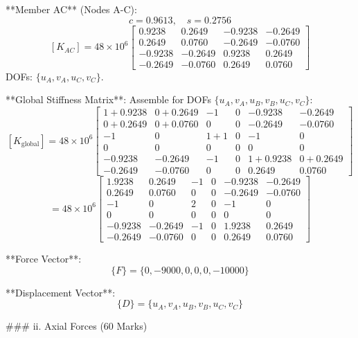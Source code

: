 **Member AC** (Nodes A-C):
\[
c = 0.9613, \quad s = 0.2756
\]
\[
[K_{AC}] = 48 \times 10^6 \begin{bmatrix} 0.9238 & 0.2649 & -0.9238 & -0.2649 \\ 0.2649 & 0.0760 & -0.2649 & -0.0760 \\ -0.9238 & -0.2649 & 0.9238 & 0.2649 \\ -0.2649 & -0.0760 & 0.2649 & 0.0760 \end{bmatrix}
\]
DOFs: \( \{ u_A, v_A, u_C, v_C \} \).

**Global Stiffness Matrix**:
Assemble for DOFs \( \{ u_A, v_A, u_B, v_B, u_C, v_C \} \):
\[
[K_{\text{global}}] = 48 \times 10^6 \begin{bmatrix}
1 + 0.9238 & 0 + 0.2649 & -1 & 0 & -0.9238 & -0.2649 \\
0 + 0.2649 & 0 + 0.0760 & 0 & 0 & -0.2649 & -0.0760 \\
-1 & 0 & 1 + 1 & 0 & -1 & 0 \\
0 & 0 & 0 & 0 & 0 & 0 \\
-0.9238 & -0.2649 & -1 & 0 & 1 + 0.9238 & 0 + 0.2649 \\
-0.2649 & -0.0760 & 0 & 0 & 0.2649 & 0.0760
\end{bmatrix}
\]
\[
= 48 \times 10^6 \begin{bmatrix}
1.9238 & 0.2649 & -1 & 0 & -0.9238 & -0.2649 \\
0.2649 & 0.0760 & 0 & 0 & -0.2649 & -0.0760 \\
-1 & 0 & 2 & 0 & -1 & 0 \\
0 & 0 & 0 & 0 & 0 & 0 \\
-0.9238 & -0.2649 & -1 & 0 & 1.9238 & 0.2649 \\
-0.2649 & -0.0760 & 0 & 0 & 0.2649 & 0.0760
\end{bmatrix}
\]

**Force Vector**:
\[
\{ F \} = \{ 0, -9000, 0, 0, 0, -10000 \}
\]

**Displacement Vector**:
\[
\{ D \} = \{ u_A, v_A, u_B, v_B, u_C, v_C \}
\]

### ii. Axial Forces (60 Marks)

